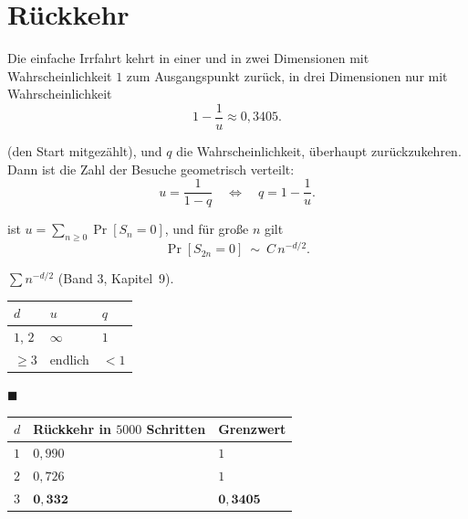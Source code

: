 \section{Rückkehr}

\begin{merksatz}
Die einfache Irrfahrt kehrt in einer und in zwei Dimensionen mit Wahrscheinlichkeit $1$ zum Ausgangspunkt zurück, in drei Dimensionen nur mit Wahrscheinlichkeit
\[ 1 - \frac{1}{u} \approx 0{,}3405 . \]

 (den Start mitgezählt), und $q$ die Wahrscheinlichkeit, überhaupt zurückzukehren. Dann ist die Zahl der Besuche geometrisch verteilt:
\[ u = \frac{1}{1-q} \quad\Longleftrightarrow\quad q = 1 - \frac1u . \]

 ist $u = \sum_{n\ge0} \Pr[S_n = 0]$, und für große $n$ gilt
\[ \Pr[S_{2n} = 0] \ \sim\ C\,n^{-d/2} . \]

 $\sum n^{-d/2}$  (Band 3, Kapitel~9).

\begin{center}
{\small
\renewcommand{\arraystretch}{1.5}
\begin{tabular}{@{}P{1.6cm}P{2.4cm}P{2.6cm}@{}}
\toprule
$d$ & $u$ & $q$\\
\midrule
$1$, $2$ & $\infty$ & $1$\\
$\ge 3$ & endlich & $< 1$\\
\bottomrule
\end{tabular}}
\end{center}
$\blacksquare$ 

\begin{center}
{\small
\renewcommand{\arraystretch}{1.46}
\begin{tabular}{@{}P{1.6cm}P{3.0cm}P{2.2cm}@{}}
\toprule
$d$ & \textbf{Rückkehr in $5000$ Schritten} & \textbf{Grenzwert}\\
\midrule
$1$ & $0{,}990$ & $1$\\
$2$ & $0{,}726$ & $1$\\
$3$ & $\mathbf{0{,}332}$ & $\mathbf{0{,}3405}$\\
\bottomrule
\end{tabular}}
\end{center}


\end{merksatz}
